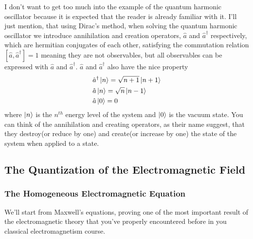 \documentclass[english, a4paper, 12pt, twoside]{article}
\numberwithin{equation}{section} %
\begin{document}
I don't want to get too much into the example of the quantum harmonic oscillator because it is expected that the reader is already familiar with it. I'll just mention, that using Dirac's method, when solving the quantum harmonic oscillator we introduce annihilation and creation operators, $\hat{a}$ and $\hat{a}^\dag$ respectively, which are hermitian conjugates of each other, satisfying the commutation relation $[\hat{a}, \hat{a}^\dag] = 1$ meaning they are not observables, but all observables can be expressed with $\hat{a}$ and $\hat{a}^\dag$. $\hat{a}$ and $\hat{a}^\dag$ also have the nice property
\begin{align*}
    &\hat{a}^\dag \ket{n} = \sqrt{n+1}\ket{n+1} \\
    &\hat{a} \ket{n} = \sqrt{n}\ket{n-1} \\
    &\hat{a}\ket{0} = 0
\end{align*}
where $\ket{n}$ is the $n^{th}$ energy level of the system and $\ket{0}$ is the vacuum state. You can think of the annihilation and creating operators, as their name suggest, that they destroy(or reduce by one) and create(or increase by one) the state of the system when applied to a state.

\subsection{The Quantization of the Electromagnetic Field}
\subsubsection{The Homogeneous Electromagnetic Equation}
We'll start from Maxwell's equations, proving one of the most important result of the electromagnetic theory that you've properly encountered before in you classical electromagnetism course.
\end{document}
